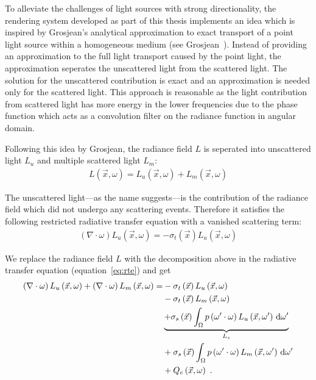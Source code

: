 To alleviate the challenges of light sources with strong directionality, the rendering system developed as part of this thesis implements an idea which is inspired by Grosjean’s analytical approximation to exact transport of a point light source within a homogeneous medium (see Grosjean~\cite{Grosjean56}). Instead of providing an approximation to the full light transport caused by the point light, the approximation seperates the unscattered light from the scattered light. The solution for the unscattered contribution is exact and an approximation is needed only for the scattered light. This approach is reasonable as the light contribution from scattered light has more energy in the lower frequencies due to the phase function which acts as a convolution filter on the radiance function in angular domain.

Following this idea by Grosjean, the radiance field $L$ is seperated into unscattered light $L_{u}$ and multiple scattered light $L_m$:
\begin{align}
L\left(\vec{x}, \omega\right) = 
L_u\left(\vec{x}, \omega\right)
+L_m\left(\vec{x}, \omega\right)
\end{align}

The unscattered light---as the name suggests---is the contribution of the radiance field which did not undergo any scattering events. Therefore it satisfies the following restricted radiative transfer equation with a vanished scattering term:
\begin{align}
\left(\nabla\cdot\omega\right)L_u\left(\vec{x}, \omega \right)
=
-\sigma_t\left(\vec{x}\right) L_u\left(\vec{x}, \omega \right)
\label{eq:restricted_rte}
\end{align}


We replace the radiance field $L$ with the decomposition above in the radiative transfer equation (equation~\ref{eq:rte}) and get
\begin{align}
\left(\nabla\cdot\omega\right)L_u\left(\vec{x}, \omega \right)
+\left(\nabla\cdot\omega\right)L_m\left(\vec{x}, \omega \right)
=&
-\sigma_t\left(\vec{x}\right) L_u\left(\vec{x}, \omega \right)
\nonumber\\
&
-\sigma_t\left(\vec{x}\right) L_m\left(\vec{x}, \omega \right)\nonumber\\
&
\underbrace
{
+\sigma_s\left(\vec{x}\right) \int_{\Omega}
{
p\left(\omega'\cdot\omega\right)L_u\left(\vec{x}, \omega' \right)\,\mathrm{d}\omega'
}
}_{L_s}
\nonumber\\
&
+\sigma_s\left(\vec{x}\right) \int_{\Omega}
{
p\left(\omega'\cdot\omega\right)L_m\left(\vec{x}, \omega' \right)\,\mathrm{d}\omega'
}
\nonumber
\\
&
+Q_e\left(\vec{x}, \omega\right)
\nonumber
\  .
\end{align}

